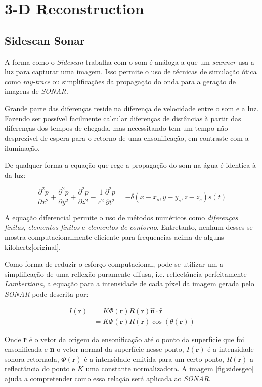 \documentclass[a4paper,11pt,oneside,brazilian]{article}
\newcommand{\cspar}[2]{\frac{\partial^2 #1}{\partial #2^2}}
\begin{document}
\section{3-D Reconstruction}

\subsection{Sidescan Sonar}
\label{sonar}

A forma como o \textit{Sidescan} trabalha com o som é análoga a que um
\textit{scanner} usa a luz para capturar uma imagem. Isso permite o uso de
técnicas de simulação ótica como \textit{ray-trace} ou simplificações da propagação
do onda para a geração de imagens de \emph{SONAR}.

Grande parte das diferenças reside na diferença de velocidade entre o som e a
luz. Fazendo ser possível facilmente calcular diferenças de distâncias à partir
das diferenças dos tempos de chegada, mas necessitando tem um tempo não
desprezível de espera para o retorno de uma ensonificação, em contraste com a
iluminação.

De qualquer forma a equação que rege a propagação do som na água é identica à da
luz:

\[\cspar{p}{x} + \cspar{p}{y} + \cspar{p}{z} - \frac{1}{c^2}\cspar{p}{t} = -
\delta(x-x_s,y-y_s,z-z_s)s(t)\]

A equação diferencial permite o uso de métodos numéricos como \emph{diferenças
finitas}, \emph{elementos finitos} e \emph{elementos de contorno}. Entretanto,
nenhum desses se mostra computacionalmente eficiente para frequencias acima de
alguns kilohertz[original].

Como forma de reduzir o esforço computacional, pode-se utilizar um a
simplificação de uma reflexão puramente difusa, i.e. reflectância perfeitamente
\emph{Lambertiana}, a equação para a intensidade de cada píxel da imagem
gerada pelo \emph{SONAR} pode descrita por:

\begin{align}
	I(\textbf{r}) &=  K \Phi(\textbf{r}) R(\textbf{r}) \hat{\textbf{n}} \cdot
\hat{\textbf{r}} \nonumber \\
	&= K \Phi(\textbf{r}) R(\textbf{r}) \cos(\theta(\textbf{r}))
	\label{eq:power}
\end{align}

Onde \textbf{r} é o vetor da origem da ensonificação até o ponto da superfície
que foi ensonificada e \textbf{n} o vetor normal da superfície nesse ponto,
\(I(\textbf{r})\) é a intensidade sonora retornada, \(\Phi(\textbf{r})\) é a
intensidade emitida para um certo ponto, \(R(\textbf{r})\) a reflectância do
ponto e \(K\) uma constante normalizadora. A imagem \ref{fig:sidesgeo} ajuda a
compretender como essa relação será aplicada ao \emph{SONAR}.
\end{document}
